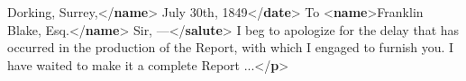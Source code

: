 \begin{shaded}
\hspace*{1em}\hspace*{1em}\mbox{}\newline 
\hspace*{1em}\hspace*{1em}\hspace*{1em}Dorking, Surrey,{</\textbf{name}>}\mbox{}\newline 
\hspace*{1em}\hspace*{1em}\hspace*{1em}July 30th, 1849{</\textbf{date}>}\mbox{}\newline 
\hspace*{1em}\hspace*{1em}\mbox{}\newline 
\hspace*{1em}\hspace*{1em}To {<\textbf{name}>}Franklin Blake, Esq.{</\textbf{name}>} Sir, —{</\textbf{salute}>}\mbox{}\newline 
\hspace*{1em}\mbox{}\newline 
\hspace*{1em}I beg to apologize for the delay that has occurred in the\mbox{}\newline 
\hspace*{1em}\hspace*{1em}\hspace*{1em}\hspace*{1em} production of the Report, with which I engaged to furnish you.\mbox{}\newline 
\hspace*{1em}\hspace*{1em}\hspace*{1em}\hspace*{1em} I have waited to make it a complete Report ...{</\textbf{p}>}\mbox{}\newline 
\hspace*{1em}\mbox{}\newline 

\end{shaded}
